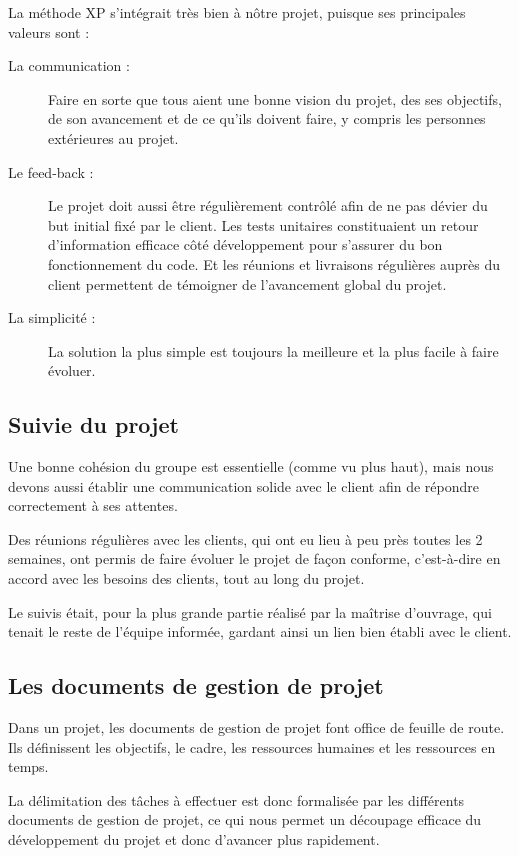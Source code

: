   La méthode XP s'intégrait très bien à nôtre projet, puisque ses principales
  valeurs sont :
  \begin{description}
    \item[La communication :] Faire en sorte que tous aient une bonne vision
    du projet, des ses objectifs, de son avancement et de ce qu'ils doivent
    faire, y compris les personnes extérieures au projet.
    \item[Le feed-back :] Le projet doit aussi être régulièrement contrôlé
    afin de ne pas dévier du but initial fixé par le client. Les tests
    unitaires constituaient un retour d'information efficace côté
    développement pour s'assurer du bon fonctionnement du code. Et les
    réunions et livraisons régulières auprès du client permettent de témoigner
    de l'avancement global du projet.
    \item[La simplicité :] La solution la plus simple est toujours la
    meilleure et la plus facile à faire évoluer.
  \end{description}


\subsection{Suivie du projet}

  Une bonne cohésion du groupe est essentielle (comme vu plus haut), mais nous
  devons aussi établir une communication solide avec le client afin de répondre
  correctement à ses attentes.

  Des réunions régulières avec les clients, qui ont eu lieu à peu près toutes
  les 2 semaines, ont permis de faire évoluer le projet de façon conforme,
  c'est-à-dire en accord avec les besoins des clients, tout au long du projet.

  Le suivis était, pour la plus grande partie réalisé par la maîtrise
  d'ouvrage, qui tenait le reste de l'équipe informée, gardant ainsi un lien
  bien établi avec le client.


\subsection{Les documents de gestion de projet}

  Dans un projet, les documents de gestion de projet font office de feuille de
  route. Ils définissent les objectifs, le cadre, les ressources humaines et
  les ressources en temps.

  La délimitation des tâches à effectuer est donc formalisée par les
  différents documents de gestion de projet, ce qui nous permet un découpage
  efficace du développement du projet et donc d'avancer plus rapidement.


